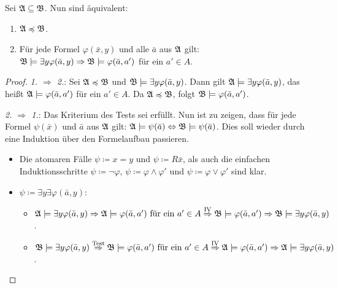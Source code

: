 \begin{satz}
	Sei $\mathfrak{A}\subseteq\mathfrak{B}$. Nun sind äquivalent:
	\begin{enumerate}
		\item $\mathfrak{A}\preccurlyeq \mathfrak{B}$.
		\item Für jede Formel $\varphi(\bar{x},y)$ und alle $\bar{a}$ aus $\mathfrak{A}$ gilt: $\mathfrak{B}\models \exists y \varphi(\bar{a},y)\Rightarrow \mathfrak{B}\models\varphi(\bar{a},a')$ für ein $a'\in A$.
	\end{enumerate}
\end{satz}
\begin{proof}
	\textit{1. $\Rightarrow$ 2.}: Sei $\mathfrak{A}\preccurlyeq\mathfrak{B}$ und $\mathfrak{B}\models\exists y \varphi(\bar{a},y)$. Dann gilt $\mathfrak{A}\models\exists y \varphi(\bar{a},y)$, das heißt $\mathfrak{A}\models\varphi(\bar{a},a')$ für ein $a'\in A$. Da $\mathfrak{A}\preccurlyeq\mathfrak{B}$, folgt $\mathfrak{B}\models\varphi(\bar{a},a')$.
	
	\textit{2. $\Rightarrow$ 1.}: Das Kriterium des Tests sei erfüllt. Nun ist zu zeigen, dass für jede Formel $\psi(\bar{x})$ und $\bar{a}$ aus $\mathfrak{A}$ gilt: $\mathfrak{A}\models\psi(\bar{a})\Leftrightarrow \mathfrak{B}\models\psi(\bar{a})$. Dies soll wieder durch eine Induktion über den Formelaufbau passieren.
	
	\begin{itemize}
		\item Die atomaren Fälle $\psi\coloneqq x=y$ und $\psi\coloneqq R\bar{x}$, als auch die einfachen Induktionsschritte $\psi\coloneqq \neg\varphi$, $\psi\coloneqq\varphi\land\varphi'$ und $\psi\coloneqq \varphi\lor\varphi'$ sind klar.
		
		\item $\psi\coloneqq\exists y \exists \varphi(\bar{a},y)$:
		\begin{itemize}
			\item $\mathfrak{A}\models\exists y\varphi(\bar{a},y)
			\Rightarrow \mathfrak{A}\models\varphi(\bar{a},a')\text{ für ein } a'\in A
			\overset{\text{IV}}{\Rightarrow}\mathfrak{B}\models\varphi(\bar{a},a')
			\Rightarrow\mathfrak{B}\models\exists y \varphi(\bar{a},y)$.
			
			\item $\mathfrak{B}\models\exists y\varphi(\bar{a},y)
			\overset{\text{Test}}{\Rightarrow} \mathfrak{B}\models\varphi(\bar{a},a')\text{ für ein } a'\in A
			\overset{\text{IV}}{\Rightarrow}\mathfrak{A}\models\varphi(\bar{a},a')
			\Rightarrow\mathfrak{A}\models\exists y\varphi(\bar{a},y)$.
		\end{itemize}
	\end{itemize}
\end{proof}

